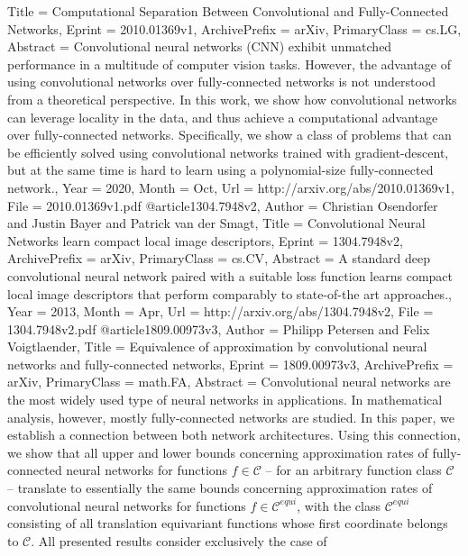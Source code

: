 {{{{Title         = {Computational Separation Between Convolutional and Fully-Connected
  Networks},
Eprint        = {2010.01369v1},
ArchivePrefix = {arXiv},
PrimaryClass  = {cs.LG},
Abstract      = {Convolutional neural networks (CNN) exhibit unmatched performance in a
multitude of computer vision tasks. However, the advantage of using
convolutional networks over fully-connected networks is not understood from a
theoretical perspective. In this work, we show how convolutional networks can
leverage locality in the data, and thus achieve a computational advantage over
fully-connected networks. Specifically, we show a class of problems that can be
efficiently solved using convolutional networks trained with gradient-descent,
but at the same time is hard to learn using a polynomial-size fully-connected
network.},
Year          = {2020},
Month         = {Oct},
Url           = {http://arxiv.org/abs/2010.01369v1},
File          = {2010.01369v1.pdf}
}
@article{1304.7948v2,
Author        = {Christian Osendorfer and Justin Bayer and Patrick van der Smagt},
Title         = {Convolutional Neural Networks learn compact local image descriptors},
Eprint        = {1304.7948v2},
ArchivePrefix = {arXiv},
PrimaryClass  = {cs.CV},
Abstract      = {A standard deep convolutional neural network paired with a suitable loss
function learns compact local image descriptors that perform comparably to
state-of-the art approaches.},
Year          = {2013},
Month         = {Apr},
Url           = {http://arxiv.org/abs/1304.7948v2},
File          = {1304.7948v2.pdf}
}
@article{1809.00973v3,
Author        = {Philipp Petersen and Felix Voigtlaender},
Title         = {Equivalence of approximation by convolutional neural networks and
  fully-connected networks},
Eprint        = {1809.00973v3},
ArchivePrefix = {arXiv},
PrimaryClass  = {math.FA},
Abstract      = {Convolutional neural networks are the most widely used type of neural
networks in applications. In mathematical analysis, however, mostly
fully-connected networks are studied. In this paper, we establish a connection
between both network architectures. Using this connection, we show that all
upper and lower bounds concerning approximation rates of {fully-connected}
neural networks for functions $f \in \mathcal{C}$ -- for an arbitrary function
class $\mathcal{C}$ -- translate to essentially the same bounds concerning
approximation rates of convolutional neural networks for functions $f \in
{\mathcal{C}^{equi}}$, with the class ${\mathcal{C}^{equi}}$ consisting of all
translation equivariant functions whose first coordinate belongs to
$\mathcal{C}$. All presented results consider exclusively the case of
}}}}}
